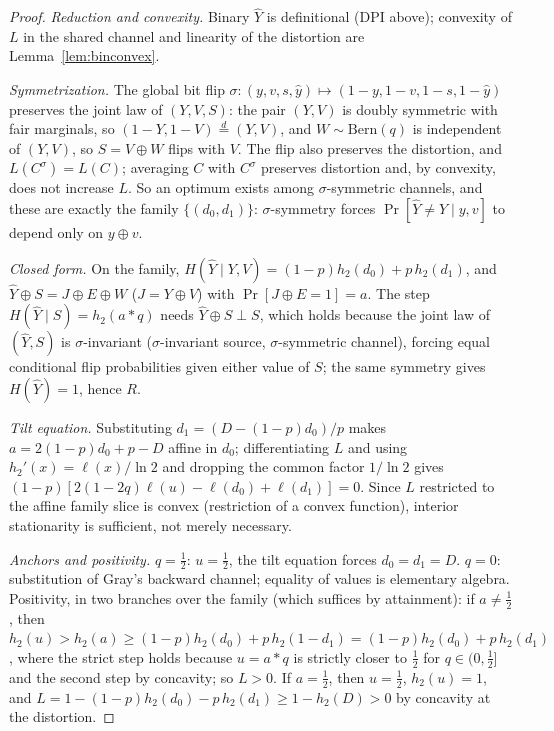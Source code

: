 ﻿\documentclass[11pt,onecolumn]{IEEEtran}
\newcommand{\hY}{\widehat{Y}}
\begin{document}
\begin{proof}
\emph{Reduction and convexity.} Binary $\hY$ is definitional (DPI
above); convexity of $L$ in the shared channel and linearity of the
distortion are Lemma~\ref{lem:binconvex}.

\emph{Symmetrization.} The global bit flip
$\sigma:(y,v,s,\hat y)\mapsto(1{-}y,1{-}v,1{-}s,1{-}\hat y)$ preserves
the joint law of $(Y,V,S)$: the pair $(Y,V)$ is doubly symmetric with
fair marginals, so $(1{-}Y,1{-}V)\overset{d}=(Y,V)$, and $W\sim
\mathrm{Bern}(q)$ is independent of $(Y,V)$, so $S=V\oplus W$ flips
with $V$. The flip also preserves the distortion, and
$L(C^\sigma)=L(C)$;
averaging $C$ with $C^\sigma$ preserves distortion and, by convexity,
does not increase $L$. So an optimum exists among $\sigma$-symmetric
channels, and these are exactly the family $\{(d_0,d_1)\}$:
$\sigma$-symmetry forces $\Pr[\hY\ne Y\mid y,v]$ to depend only on
$y\oplus v$.

\emph{Closed form.} On the family, $H(\hY\mid Y,V)=
(1-p)h_2(d_0)+p\,h_2(d_1)$, and $\hY\oplus S=J\oplus E\oplus W$
($J=Y\oplus V$) with $\Pr[J\oplus E=1]=a$. The step
$H(\hY\mid S)=h_2(a*q)$ needs $\hY\oplus S\perp S$, which holds
because the joint law of $(\hY,S)$ is $\sigma$-invariant
($\sigma$-invariant source, $\sigma$-symmetric channel), forcing equal
conditional flip probabilities given either value of $S$; the same
symmetry gives $H(\hY)=1$, hence $R$.

\emph{Tilt equation.} Substituting $d_1=(D-(1-p)d_0)/p$ makes
$a=2(1-p)d_0+p-D$ affine in $d_0$; differentiating $L$ and using
$h_2'(x)=\ell(x)/\ln2$ and dropping the common factor $1/\ln2$ gives
$(1-p)[2(1-2q)\ell(u)-\ell(d_0)+\ell(d_1)]=0$. Since $L$ restricted to
the affine family slice is convex (restriction of a convex function),
interior stationarity is sufficient, not merely necessary.

\emph{Anchors and positivity.} $q=\tfrac12$: $u=\tfrac12$, the tilt
equation forces $d_0=d_1=D$. $q=0$: substitution of Gray's backward
channel; equality of values is elementary algebra. Positivity, in two
branches over the family (which suffices by attainment): if
$a\ne\tfrac12$, then $h_2(u)>h_2(a)\ge(1-p)h_2(d_0)+p\,h_2(1-d_1)
=(1-p)h_2(d_0)+p\,h_2(d_1)$, where the strict step holds because $u=a*q$
is strictly closer to $\tfrac12$ for $q\in(0,\tfrac12]$ and the second
step by concavity; so $L>0$. If $a=\tfrac12$, then $u=\tfrac12$,
$h_2(u)=1$, and $L=1-(1-p)h_2(d_0)-p\,h_2(d_1)\ge1-h_2(D)>0$ by
concavity at the distortion.
\end{proof}
\end{document}
